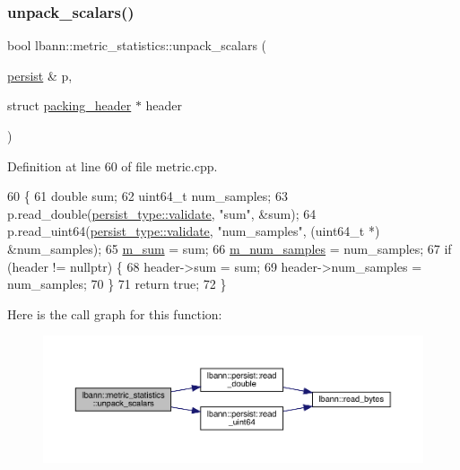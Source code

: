 \subsubsection{\texorpdfstring{unpack\+\_\+scalars()}{unpack\_scalars()}}
{\footnotesize\ttfamily bool lbann\+::metric\+\_\+statistics\+::unpack\+\_\+scalars (\begin{DoxyParamCaption}\item[{\hyperlink{classlbann_1_1persist}{persist} \&}]{p,  }\item[{struct \hyperlink{structlbann_1_1metric__statistics_1_1packing__header}{packing\+\_\+header} $\ast$}]{header }\end{DoxyParamCaption})}



Definition at line 60 of file metric.\+cpp.


\begin{DoxyCode}
60                                                                                 \{
61   \textcolor{keywordtype}{double} sum;
62   uint64\_t num\_samples;
63   p.read\_double(\hyperlink{namespacelbann_adee41f31f15f3906cbdcce4a1417eb56af9ab05454998236921a6b0e281fae632}{persist\_type::validate}, \textcolor{stringliteral}{"sum"}, &sum);
64   p.read\_uint64(\hyperlink{namespacelbann_adee41f31f15f3906cbdcce4a1417eb56af9ab05454998236921a6b0e281fae632}{persist\_type::validate}, \textcolor{stringliteral}{"num\_samples"}, (uint64\_t *) &num\_samples);
65   \hyperlink{structlbann_1_1metric__statistics_a3481b2bb165e12a52db847f40a70f800}{m\_sum} = sum;
66   \hyperlink{structlbann_1_1metric__statistics_a6633bf91863b7e2327563ac93a9783f7}{m\_num\_samples} = num\_samples;
67   \textcolor{keywordflow}{if} (header != \textcolor{keyword}{nullptr}) \{
68     header->sum = sum;
69     header->num\_samples = num\_samples;
70   \}
71   \textcolor{keywordflow}{return} \textcolor{keyword}{true};
72 \}
\end{DoxyCode}
Here is the call graph for this function\+:\nopagebreak
\begin{figure}[H]
\begin{center}
\leavevmode
\includegraphics[width=350pt]{structlbann_1_1metric__statistics_a4ff472c5d9155fe28c5a576c49f1e154_cgraph}
\end{center}
\end{figure}


